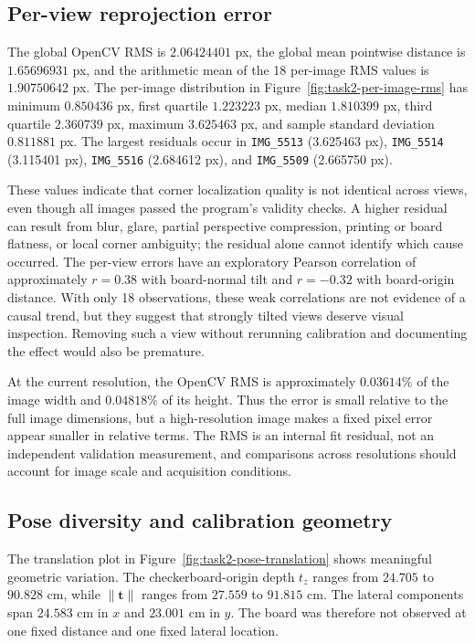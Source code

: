 \subsection{Per-view reprojection error}

The global OpenCV RMS is \(2.06424401\) px, the global mean pointwise distance is \(1.65696931\) px, and the arithmetic mean of the 18 per-image RMS values is \(1.90750642\) px. The per-image distribution in Figure~\ref{fig:task2-per-image-rms} has minimum \(0.850436\) px, first quartile \(1.223223\) px, median \(1.810399\) px, third quartile \(2.360739\) px, maximum \(3.625463\) px, and sample standard deviation \(0.811881\) px. The largest residuals occur in \texttt{IMG\_5513} (3.625463 px), \texttt{IMG\_5514} (3.115401 px), \texttt{IMG\_5516} (2.684612 px), and \texttt{IMG\_5509} (2.665750 px).

These values indicate that corner localization quality is not identical across views, even though all images passed the program's validity checks. A higher residual can result from blur, glare, partial perspective compression, printing or board flatness, or local corner ambiguity; the residual alone cannot identify which cause occurred. The per-view errors have an exploratory Pearson correlation of approximately \(r=0.38\) with board-normal tilt and \(r=-0.32\) with board-origin distance. With only 18 observations, these weak correlations are not evidence of a causal trend, but they suggest that strongly tilted views deserve visual inspection. Removing such a view without rerunning calibration and documenting the effect would also be premature.

At the current resolution, the OpenCV RMS is approximately \(0.03614\%\) of the image width and \(0.04818\%\) of its height. Thus the error is small relative to the full image dimensions, but a high-resolution image makes a fixed pixel error appear smaller in relative terms. The RMS is an internal fit residual, not an independent validation measurement, and comparisons across resolutions should account for image scale and acquisition conditions.

\subsection{Pose diversity and calibration geometry}

The translation plot in Figure~\ref{fig:task2-pose-translation} shows meaningful geometric variation. The checkerboard-origin depth \(t_z\) ranges from \(24.705\) to \(90.828\) cm, while \(\lVert\mathbf t\rVert\) ranges from \(27.559\) to \(91.815\) cm. The lateral components span \(24.583\) cm in \(x\) and \(23.001\) cm in \(y\). The board was therefore not observed at one fixed distance and one fixed lateral location.

